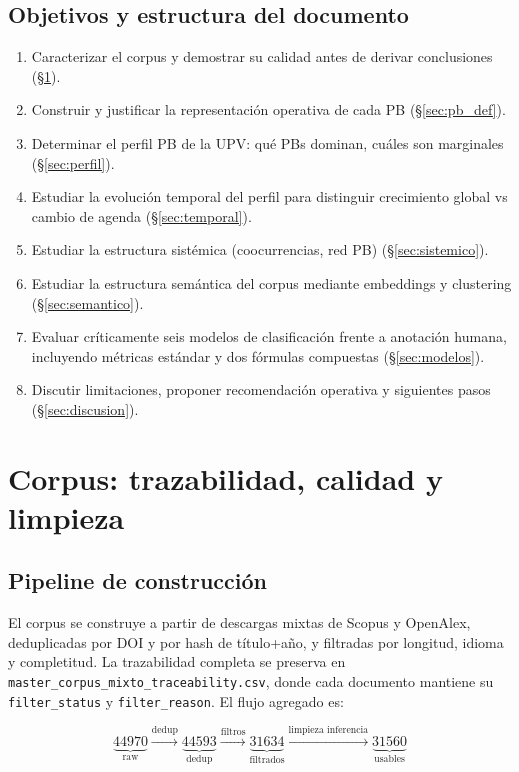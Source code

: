 \documentclass[11pt,a4paper]{article}
\begin{document}
\subsection{Objetivos y estructura del documento}

\begin{enumerate}
\item Caracterizar el corpus y demostrar su calidad antes de derivar conclusiones (§\ref{sec:corpus}).
\item Construir y justificar la representación operativa de cada PB (§\ref{sec:pb_def}).
\item Determinar el perfil PB de la UPV: qué PBs dominan, cuáles son marginales (§\ref{sec:perfil}).
\item Estudiar la evolución temporal del perfil para distinguir crecimiento global vs cambio de agenda (§\ref{sec:temporal}).
\item Estudiar la estructura sistémica (coocurrencias, red PB) (§\ref{sec:sistemico}).
\item Estudiar la estructura semántica del corpus mediante embeddings y clustering (§\ref{sec:semantico}).
\item Evaluar críticamente seis modelos de clasificación frente a anotación humana, incluyendo métricas estándar y dos fórmulas compuestas (§\ref{sec:modelos}).
\item Discutir limitaciones, proponer recomendación operativa y siguientes pasos (§\ref{sec:discusion}).
\end{enumerate}

\section{Corpus: trazabilidad, calidad y limpieza}\label{sec:corpus}

\subsection{Pipeline de construcción}

El corpus se construye a partir de descargas mixtas de Scopus y OpenAlex, deduplicadas por DOI y por hash de título+año, y filtradas por longitud, idioma y completitud. La trazabilidad completa se preserva en \texttt{master\_corpus\_mixto\_traceability.csv}, donde cada documento mantiene su \texttt{filter\_status} y \texttt{filter\_reason}. El flujo agregado es:

\[
\underbrace{\num{44970}}_{\text{raw}} \xrightarrow{\text{dedup}} \underbrace{\num{44593}}_{\text{dedup}} \xrightarrow{\text{filtros}} \underbrace{\num{31634}}_{\text{filtrados}} \xrightarrow{\text{limpieza inferencia}} \underbrace{\num{31560}}_{\text{usables}}
\]
\end{document}
